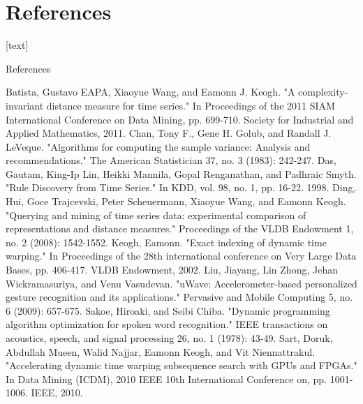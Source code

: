 \section{References}

[text]

\begin{frame}[allowframebreaks]{References}
    \begin{thebibliography}{1}
         Batista, Gustavo EAPA, Xiaoyue Wang, and Eamonn J. Keogh. "A complexity-invariant
            distance measure for time series." In Proceedings of the 2011 SIAM International Conference on Data Mining, pp.
            699-710. Society for Industrial and Applied Mathematics, 2011.
         Chan, Tony F., Gene H. Golub, and Randall J. LeVeque. "Algorithms for computing the
            sample variance: Analysis and recommendations." The American Statistician 37, no. 3 (1983): 242-247.
         Das, Gautam, King-Ip Lin, Heikki Mannila, Gopal Renganathan, and Padhraic Smyth. "Rule
            Discovery from Time Series." In KDD, vol. 98, no. 1, pp. 16-22. 1998.
         Ding, Hui, Goce Trajcevski, Peter Scheuermann, Xiaoyue Wang, and Eamonn Keogh. "Querying
            and mining of time series data: experimental comparison of representations and distance measures." Proceedings
            of the VLDB Endowment 1, no. 2 (2008): 1542-1552.
         Keogh, Eamonn. "Exact indexing of dynamic time warping." In Proceedings of the 28th
            international conference on Very Large Data Bases, pp. 406-417. VLDB Endowment, 2002.
         Liu, Jiayang, Lin Zhong, Jehan Wickramasuriya, and Venu Vasudevan. "uWave:
            Accelerometer-based personalized gesture recognition and its applications." Pervasive and Mobile Computing 5,
            no. 6 (2009): 657-675.
         Sakoe, Hiroaki, and Seibi Chiba. "Dynamic programming algorithm optimization for spoken
            word recognition." IEEE transactions on acoustics, speech, and signal processing 26, no. 1 (1978): 43-49.
         Sart, Doruk, Abdullah Mueen, Walid Najjar, Eamonn Keogh, and Vit Niennattrakul.
            "Accelerating dynamic time warping subsequence search with GPUs and FPGAs." In Data Mining (ICDM), 2010 IEEE
            10th International Conference on, pp. 1001-1006. IEEE, 2010.
    \end{thebibliography}
\end{frame}
